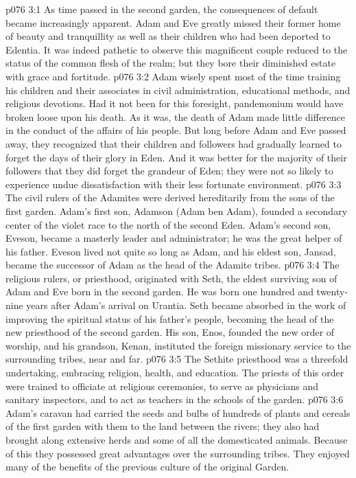 \vs p076 3:1 As time passed in the second garden, the consequences of default became increasingly apparent. Adam and Eve greatly missed their former home of beauty and tranquillity as well as their children who had been deported to Edentia. It was indeed pathetic to observe this magnificent couple reduced to the status of the common flesh of the realm; but they bore their diminished estate with grace and fortitude.
\vs p076 3:2 Adam wisely spent most of the time training his children and their associates in civil administration, educational methods, and religious devotions. Had it not been for this foresight, pandemonium would have broken loose upon his death. As it was, the death of Adam made little difference in the conduct of the affairs of his people. But long before Adam and Eve passed away, they recognized that their children and followers had gradually learned to forget the days of their glory in Eden. And it was better for the majority of their followers that they did forget the grandeur of Eden; they were not so likely to experience undue dissatisfaction with their less fortunate environment.
\vs p076 3:3 \pc The civil rulers of the Adamites were derived hereditarily from the sons of the first garden. Adam’s first son, Adamson (Adam ben Adam), founded a secondary center of the violet race to the north of the second Eden. Adam’s second son, Eveson, became a masterly leader and administrator; he was the great helper of his father. Eveson lived not quite so long as Adam, and his eldest son, Jansad, became the successor of Adam as the head of the Adamite tribes.
\vs p076 3:4 \pc The religious rulers, or priesthood, originated with Seth, the eldest surviving son of Adam and Eve born in the second garden. He was born one hundred and twenty\hyp{}nine years after Adam’s arrival on Urantia. Seth became absorbed in the work of improving the spiritual status of his father’s people, becoming the head of the new priesthood of the second garden. His son, Enos, founded the new order of worship, and his grandson, Kenan, instituted the foreign missionary service to the surrounding tribes, near and far.
\vs p076 3:5 The Sethite priesthood was a threefold undertaking, embracing religion, health, and education. The priests of this order were trained to officiate at religious ceremonies, to serve as physicians and sanitary inspectors, and to act as teachers in the schools of the garden.
\vs p076 3:6 \pc Adam’s caravan had carried the seeds and bulbs of hundreds of plants and cereals of the first garden with them to the land between the rivers; they also had brought along extensive herds and some of all the domesticated animals. Because of this they possessed great advantages over the surrounding tribes. They enjoyed many of the benefits of the previous culture of the original Garden.
